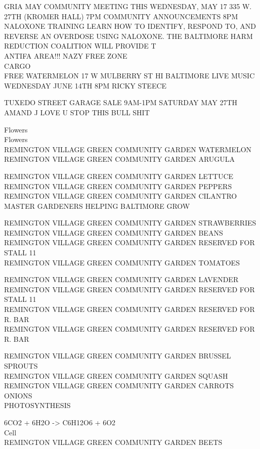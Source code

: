 \documentclass[10pt,letterpaper]{article}
\begin{document}
GRIA MAY COMMUNITY MEETING THIS WEDNESDAY, MAY 17 335 W. 27TH (KROMER HALL) 7PM COMMUNITY ANNOUNCEMENTS 8PM NALOXONE TRAINING LEARN HOW TO IDENTIFY, RESPOND TO, AND REVERSE AN OVERDOSE USING NALOXONE.  THE BALTIMORE HARM REDUCTION COALITION WILL PROVIDE T\\
ANTIFA AREA!!! NAZY FREE ZONE\\
CARGO\\
FREE WATERMELON 17 W MULBERRY ST HI BALTIMORE LIVE MUSIC WEDNESDAY JUNE 14TH 8PM RICKY STEECE

TUXEDO STREET GARAGE SALE 9AM{-}1PM SATURDAY MAY 27TH\\
AMAND J LOVE U STOP THIS BULL SHIT

Flowers\\
Flowers\\
REMINGTON VILLAGE GREEN COMMUNITY GARDEN WATERMELON\\
REMINGTON VILLAGE GREEN COMMUNITY GARDEN ARUGULA

REMINGTON VILLAGE GREEN COMMUNITY GARDEN LETTUCE\\
REMINGTON VILLAGE GREEN COMMUNITY GARDEN PEPPERS\\
REMINGTON VILLAGE GREEN COMMUNITY GARDEN CILANTRO\\
MASTER GARDENERS HELPING BALTIMORE GROW

REMINGTON VILLAGE GREEN COMMUNITY GARDEN STRAWBERRIES\\
REMINGTON VILLAGE GREEN COMMUNITY GARDEN BEANS\\
REMINGTON VILLAGE GREEN COMMUNITY GARDEN RESERVED FOR STALL 11\\
REMINGTON VILLAGE GREEN COMMUNITY GARDEN TOMATOES

REMINGTON VILLAGE GREEN COMMUNITY GARDEN LAVENDER\\
REMINGTON VILLAGE GREEN COMMUNITY GARDEN RESERVED FOR STALL 11\\
REMINGTON VILLAGE GREEN COMMUNITY GARDEN RESERVED FOR R. BAR\\
REMINGTON VILLAGE GREEN COMMUNITY GARDEN RESERVED FOR R. BAR

REMINGTON VILLAGE GREEN COMMUNITY GARDEN BRUSSEL SPROUTS\\
REMINGTON VILLAGE GREEN COMMUNITY GARDEN SQUASH\\
REMINGTON VILLAGE GREEN COMMUNITY GARDEN CARROTS ONIONS\\
PHOTOSYNTHESIS

6CO2 + 6H2O {-}> C6H12O6 + 6O2\\
Cell\\
REMINGTON VILLAGE GREEN COMMUNITY GARDEN BEETS
\end{document}
